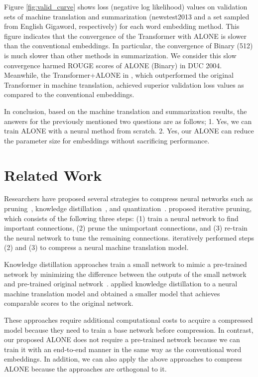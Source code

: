 \documentclass{article}
\begin{document}
Figure \ref{fig:valid_curve} shows loss (negative log likelihood) values on validation sets of machine translation and summarization (newstest2013 and a set sampled from English Gigaword, respectively) for each word embedding method.
This figure indicates that the convergence of the Transformer with ALONE is slower than the conventional embeddings.
In particular, the convergence of Binary (512) is much slower than other methods in summarization.
We consider this slow convergence harmed ROUGE scores of ALONE (Binary) in DUC 2004.
Meanwhile, the Transformer+ALONE in , which outperformed the original Transformer in machine translation, achieved superior validation loss values as compared to the conventional embeddings.

In conclusion, based on the machine translation and summarization results, the answers for the previously mentioned two questions are as follows; 1. Yes, we can train ALONE with a neural method from scratch. 2. Yes, our ALONE can reduce the parameter size for embeddings without sacrificing performance.


\section{Related Work}
Researchers have proposed several strategies to compress neural networks such as pruning~\cite{NIPS1989_250,NIPS2015_5784,zhang-etal-2017-towards}, knowledge distillation~\cite{44873,kim-rush-2016-sequence}, and quantization~\cite{DBLP:journals/corr/GongLYB14,Hashednet,Shu:coding,pmlr-v80-chen18g,Suzuki:Compress:Embed,NIPS2017_7078}.
\citet{NIPS2015_5784} proposed iterative pruning, which consists of the following three steps: (1) train a neural network to find important connections, (2) prune the unimportant connections, and (3) re-train the neural network to tune the remaining connections.
\citet{zhang-etal-2017-towards} iteratively performed steps (2) and (3) to compress a neural machine translation model.

Knowledge distillation approaches train a small network to mimic a pre-trained network by minimizing the difference between the outputs of the small network and pre-trained original network~\cite{44873,kim-rush-2016-sequence}.
\citet{kim-rush-2016-sequence} applied knowledge distillation to a neural machine translation model and obtained a smaller model that achieves comparable scores to the original network.

These approaches require additional computational costs to acquire a compressed model because they need to train a base network before compression.
In contrast, our proposed ALONE does not require a pre-trained network because we can train it with an end-to-end manner in the same way as the conventional word embeddings.
In addition, we can also apply the above approaches to compress ALONE because the approaches are orthogonal to it.
\end{document}
